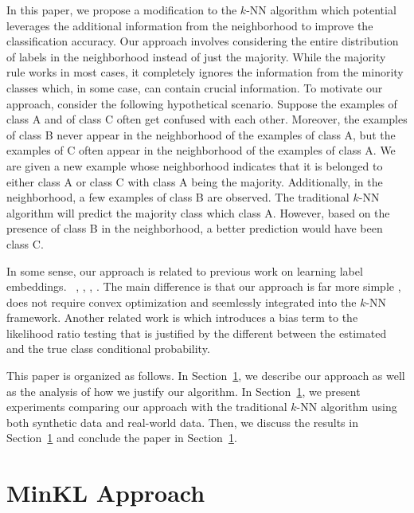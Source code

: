 \documentclass{article}
\begin{document}
In this paper, we propose a modification to the $k$-NN algorithm which
potential leverages the additional information from the neighborhood
to improve the classification accuracy. Our approach involves
considering the entire distribution of labels in the neighborhood
instead of just the majority. While the majority rule works in most
cases, it completely ignores the information from the minority classes
which, in some case, can contain crucial information. To motivate our
approach, consider the following hypothetical scenario. Suppose the
examples of class A and of class C often get confused with each
other. Moreover, the examples of class B never appear in the
neighborhood of the examples of class A, but the examples of C often
appear in the neighborhood of the examples of class A. We are given a
new example whose neighborhood indicates that it is belonged to either
class A or class C with class A being the majority. Additionally, in
the neighborhood, a few examples of class B are observed. The
traditional $k$-NN algorithm will predict the majority class which
class A. However, based on the presence of class B in the
neighborhood, a better prediction would have been class C.

In some sense, our approach is related to previous work on learning
label embeddings.~ \cite{Singh-Miller and Collins}, \cite{Dietterich
  Bakiri}, \cite{Allwien, Schapire, Singer}, \cite{Samy Bengio}. The
main difference is that our approach is far more simple , does not
require convex optimization and seemlessly integrated into the $k$-NN
framework. Another related work is \cite{Bilmes} which introduces a
bias term to the likelihood ratio testing that is justified by the
different between the estimated and the true class conditional
probability. 

This paper is organized as follows. In Section~\ref{}, we describe our
approach as well as the analysis of how we justify our algorithm. In
Section~\ref{}, we present experiments comparing our approach with the
traditional $k$-NN algorithm using both synthetic data and real-world
data. Then, we discuss the results in Section~\ref{} and conclude the
paper in Section~\ref{}.

\section{MinKL Approach}

\newcommand{\X}{\mathcal{X}}
\newcommand{\Y}{\mathcal{Y}}
\newcommand{\D}{\mathcal{D}}
\newcommand{\S}{\mathcal{S}}
\newcommand{\nh}{\mathcal{N}}
\end{document}
